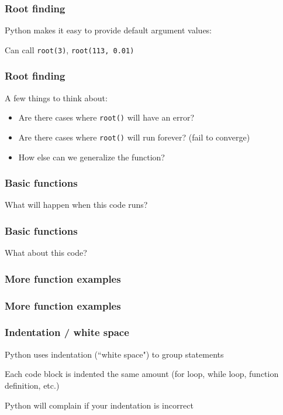 \documentclass{beamer}
\begin{document}
\begin{frame}
\frametitle{Root finding}
Python makes it easy to provide default argument values:



Can call \texttt{root(3)}, \texttt{root(113, 0.01)}
\end{frame}

\begin{frame}
\frametitle{Root finding}
A few things to think about:
\vspace{0.1in}
\begin{itemize}
\setlength{\itemsep}{0.1in}
\item{Are there cases where \texttt{root()} will have an error?}
\item{Are there cases where \texttt{root()} will run forever? (fail to converge)}
\item{How else can we generalize the function?}
\end{itemize}
\end{frame}


\begin{frame}
\frametitle{Basic functions}

What will happen when this code runs?



\end{frame}

\begin{frame}
\frametitle{Basic functions}

What about this code?

\end{frame}


\begin{frame}
\frametitle{More function examples}

\end{frame}

\begin{frame}
\frametitle{More function examples}

\end{frame}


\begin{frame}
\frametitle{Indentation / white space}

Python uses indentation (``white space") to group statements

\vspace{0.15in}

Each code block is indented the same amount (for loop, while loop, function definition, etc.)

\vspace{0.15in}

Python will complain if your indentation is incorrect
\end{frame}
\end{document}
